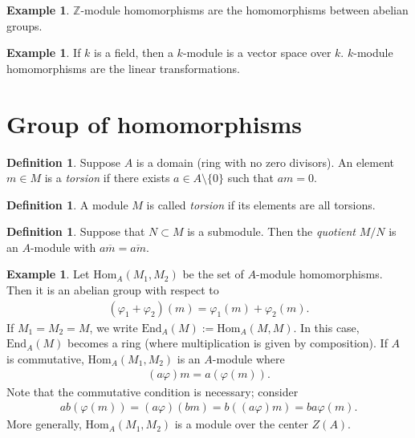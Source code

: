 \documentclass[12pt]{report}
\theoremstyle{plain}
\theoremstyle{remark}
\theoremstyle{definition}
\newtheorem{definition}[theorem]{Definition}
\newtheorem{example}[theorem]{Example}
\newcommand{\Z}{\mathbb{Z}}
\begin{document}
\begin{example}
    $\Z$-module homomorphisms are the homomorphisms between abelian groups.
\end{example}

\begin{example}
    If $k$ is a field, then a $k$-module is a vector space over $k$. $k$-module homomorphisms are the linear transformations.
\end{example}


\section{Group of homomorphisms}
\begin{definition}
    Suppose $A$ is a domain (ring with no zero divisors). An element $m\in M$ is a \emph{torsion} if there exists $a\in A\setminus\{0\}$ such that $am=0$.
\end{definition}

\begin{definition}
    A module $M$ is called \emph{torsion} if its elements are all torsions.
\end{definition}

\begin{definition}
    Suppose that $N\subset M$ is a submodule. Then the \emph{quotient} $M/N$ is an $A$-module with $a\overline{m} = \overline{am}$.
\end{definition}

\begin{example}
    Let $\mathrm{Hom}_A(M_1,M_2)$ be the set of $A$-module homomorphisms. Then it is an abelian group with respect to
    \begin{align*}
        (\varphi_1+\varphi_2)(m) = \varphi_1(m)+\varphi_2(m).
    \end{align*}
    If $M_1=M_2=M$, we write $\mathrm{End}_A(M):=\mathrm{Hom}_A(M,M)$. In this case, $\mathrm{End}_A(M)$ becomes a ring (where multiplication is given by composition). If $A$ is commutative, $\mathrm{Hom}_A(M_1,M_2)$ is an $A$-module where
    \begin{align*}
        (a\varphi)m = a(\varphi(m)).
    \end{align*}
    Note that the commutative condition is necessary; consider
    \begin{align*}
        ab(\varphi(m)) = (a\varphi)(bm) = b((a\varphi)m) = ba\varphi(m).
    \end{align*}
    More generally, $\mathrm{Hom}_A(M_1,M_2)$ is a module over the center $Z(A)$.
\end{example}
\end{document}
